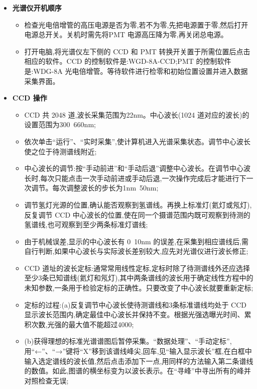 \documentclass[12pt, a4paper]{article}
\begin{document}
\begin{enumerate}
\begin{itemize}
        \item \textbf{光谱仪开机顺序}
            \begin{itemize}
                \item 检查光电倍增管的高压电源是否为零,若不为零,先把电源置于零,然后打开电源总开关。关机时需先将PMT 电源高压降为零,再关闭总电源。
                \item 打开电脑,将光谱仪左下侧的 CCD 和 PMT 转换开关置于所需位置后点击相应的软件。CCD 的控制软件是:WGD-8A-CCD;PMT 的控制软件是:WDG-8A 光电倍增管。等待软件进行检零和初始位置设置并进入数据采集界面。
            \end{itemize}
            
        \item \textbf{CCD 操作}
            \begin{itemize}
                \item  CCD 共 2048 道,波长采集范围为22nm。中心波长(1024 道对应的波长)的设置范围为300~660nm;
                \item 依次单击“运行”、“实时采集”,使计算机进入光谱采集状态。调节中心波长使之位于待测谱线附近;
                \item 中心波长的调节:按“手动前进”和“手动后退”调整中心波长。在调节中心波长时,每次只能点击一次手动前进或手动后退,一次操作完成后才能进行下一次调节。每次调整波长的步长为1nm~50nm;
                \item 调节氢灯光源的位置,确认能否观察到氢谱线。再换上标准灯(氦灯或氖灯),反复调节 CCD 中心波长的位置,使在同一个摄谱范围内既可观察到待测的氢谱线,也可观察到至少两条标准灯谱线;
                \item 由于机械误差,显示的中心波长有 0~10nm 的误差,在采集到相应谱线后,需自行判断,如果中心波长与实际波长差别较大,应先对光谱仪进行波长修正;
                \item CCD 道址的波长定标:通常常用线性定标,定标时除了待测谱线外还应选择至少3条已知谱线(氦灯和氖灯),其中两条谱线的波长用于确定线性方程中的未知参数,一条用于检验定标的正确性。只要改变了中心波长就要重新定标;
                \item  定标的过程:(a)反复调节中心波长使待测谱线和3条标准谱线均处于 CCD 显示波长范围内,确定最佳中心波长并保持不变。根据光强选曝光时间、累积次数,光强的最大值不能超过4000;
                \item  (b)获得理想的标准光谱谱图后暂停采集。“数据处理”、“手动定标”,用“←”、“→”键将“X”移到该谱线峰尖,回车,见“输入显示波长”框,在白框中输入选定谱线的波长值,然后点击添加下一点,用同样的方法输入第二条谱线的数值。如此,图谱的横坐标变为以波长表示。在“寻峰”中寻出所有的峰并对照检查无误;

\end{itemize}
\end{itemize}
\end{enumerate}
\end{document}
